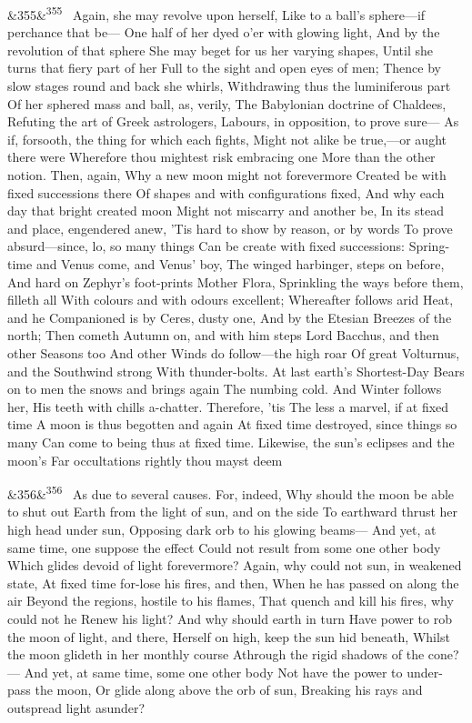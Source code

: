 \documentclass[12pt]{article}
\newcommand{\para}[1][]{\par\noindent\ifx&#1&\else\textsuperscript{\footnotesize #1}~\fi}
\begin{document}
\para[355] Again, she may revolve upon herself, Like to a ball's sphere---if perchance that be--- One half of her dyed o'er with glowing light, And by the revolution of that sphere She may beget for us her varying shapes, Until she turns that fiery part of her Full to the sight and open eyes of men; Thence by slow stages round and back she whirls, Withdrawing thus the luminiferous part Of her sphered mass and ball, as, verily, The Babylonian doctrine of Chaldees, Refuting the art of Greek astrologers, Labours, in opposition, to prove sure--- As if, forsooth, the thing for which each fights, Might not alike be true,---or aught there were Wherefore thou mightest risk embracing one More than the other notion. Then, again, Why a new moon might not forevermore Created be with fixed successions there Of shapes and with configurations fixed, And why each day that bright created moon Might not miscarry and another be, In its stead and place, engendered anew, 'Tis hard to show by reason, or by words To prove absurd---since, lo, so many things Can be create with fixed successions: Spring-time and Venus come, and Venus' boy, The winged harbinger, steps on before, And hard on Zephyr's foot-prints Mother Flora, Sprinkling the ways before them, filleth all With colours and with odours excellent; Whereafter follows arid Heat, and he Companioned is by Ceres, dusty one, And by the Etesian Breezes of the north; Then cometh Autumn on, and with him steps Lord Bacchus, and then other Seasons too And other Winds do follow---the high roar Of great Volturnus, and the Southwind strong With thunder-bolts. At last earth's Shortest-Day Bears on to men the snows and brings again The numbing cold. And Winter follows her, His teeth with chills a-chatter. Therefore, 'tis The less a marvel, if at fixed time A moon is thus begotten and again At fixed time destroyed, since things so many Can come to being thus at fixed time. Likewise, the sun's eclipses and the moon's Far occultations rightly thou mayst deem

\para[356] As due to several causes. For, indeed, Why should the moon be able to shut out Earth from the light of sun, and on the side To earthward thrust her high head under sun, Opposing dark orb to his glowing beams--- And yet, at same time, one suppose the effect Could not result from some one other body Which glides devoid of light forevermore? Again, why could not sun, in weakened state, At fixed time for-lose his fires, and then, When he has passed on along the air Beyond the regions, hostile to his flames, That quench and kill his fires, why could not he Renew his light? And why should earth in turn Have power to rob the moon of light, and there, Herself on high, keep the sun hid beneath, Whilst the moon glideth in her monthly course Athrough the rigid shadows of the cone?--- And yet, at same time, some one other body Not have the power to under-pass the moon, Or glide along above the orb of sun, Breaking his rays and outspread light asunder?
\end{document}
